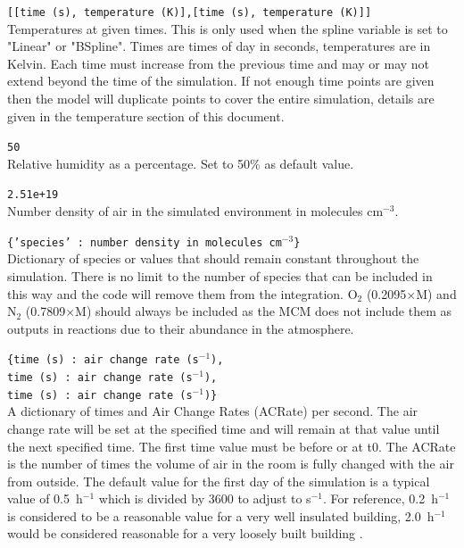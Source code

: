 \documentclass[a4paper]{refart}
\begin{document}
\texttt{[[time (s), temperature (K)],[time (s), temperature (K)]]}\\
Temperatures at given times. This is only used when the spline variable is set to "Linear" or "BSpline". Times are times of day in seconds, temperatures are in Kelvin. Each time must increase from the previous time and may or may not extend beyond the time of the simulation. If not enough time points are given then the model will duplicate points to cover the entire simulation, details are given in  the temperature section of this document.

\texttt{50}\\
Relative humidity as a percentage. Set to 50\% as default value.

\texttt{2.51e+19}\\
Number density of air in the simulated environment in molecules cm$^{-3}$.

\texttt{\{'species' : number density in molecules cm$^{-3}$\}}\\
Dictionary of species or values that should remain constant throughout the simulation. There is no limit to the number of species that can be included in this way and the code will remove them from the integration. O$_2$ (0.2095$\times$M) and N$_2$ (0.7809$\times$M) should always be included as the MCM does not include them as outputs in reactions due to their abundance in the atmosphere.

\label{ACRate}
\texttt{\{time (s) : air change rate (s$^{-1}$),\\
        time (s) : air change rate (s$^{-1}$),\\
        time (s) : air change rate (s$^{-1}$)\}}\\
A dictionary of times and Air Change Rates (ACRate) per second. The air change rate will be set at the specified time and will remain at that value until the next specified time. The first time value must be before or at t0. The ACRate is the number of times the volume of air in the room is fully changed with the air from outside. The default value for the first day of the simulation is a typical value of 0.5~h$^{-1}$ which is divided by 3600 to adjust to s$^{-1}$. For reference, 0.2~h$^{-1}$ is considered to be a reasonable value for a very well insulated building, 2.0~h$^{-1}$ would be considered reasonable for a very loosely built building \cite{Weschler2000}. 
\end{document}
